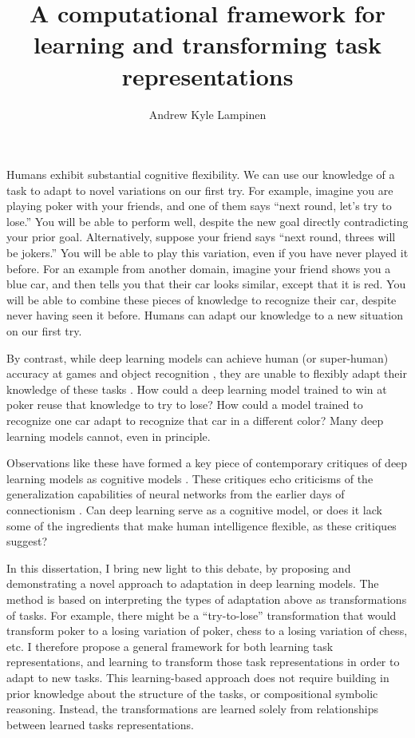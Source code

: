 \documentclass[12pt]{article}
\title{A computational framework for learning and transforming task representations}
\author{Andrew Kyle Lampinen}
\date{}
\begin{document}
\maketitle

Humans exhibit substantial cognitive flexibility. We can use our knowledge of a task to adapt to novel variations on our first try. For example, imagine you are playing poker with your friends, and one of them says ``next round, let's try to lose.'' You will be able to perform well, despite the new goal directly contradicting your prior goal. Alternatively, suppose your friend says ``next round, threes will be jokers.'' You will be able to play this variation, even if you have never played it before. For an example from another domain, imagine your friend shows you a blue car, and then tells you that their car looks similar, except that it is red. You will be able to combine these pieces of knowledge to recognize their car, despite never having seen it before. Humans can adapt our knowledge to a new situation on our first try. 

By contrast, while deep learning models can achieve human (or super-human) accuracy at games \citep{Silver2017,Vinyals2019} and object recognition \citep{Szegedy2016}, they are unable to flexibly adapt their knowledge of these tasks \citep{Lake2016}. How could a deep learning model trained to win at poker reuse that knowledge to try to lose? How could a model trained to recognize one car adapt to recognize that car in a different color? Many deep learning models cannot, even in principle.  

Observations like these have formed a key piece of contemporary critiques of deep learning models as cognitive models \citep{Lake2016,Marcus2018}. These critiques echo criticisms of the generalization capabilities of neural networks from the earlier days of connectionism \citep{Fodor1988}. Can deep learning serve as a cognitive model, or does it lack some of the ingredients that make human intelligence flexible, as these critiques suggest? 

In this dissertation, I bring new light to this debate, by proposing and demonstrating a novel approach to adaptation in deep learning models. The method is based on interpreting the types of adaptation above as transformations of tasks. For example, there might be a ``try-to-lose'' transformation that would transform poker to a losing variation of poker, chess to a losing variation of chess, etc. I therefore propose a general framework for both learning task representations, and learning to transform those task representations in order to adapt to new tasks. This learning-based approach does not require building in prior knowledge about the structure of the tasks, or compositional symbolic reasoning. Instead, the transformations are learned solely from relationships between learned tasks representations. 
\end{document}

